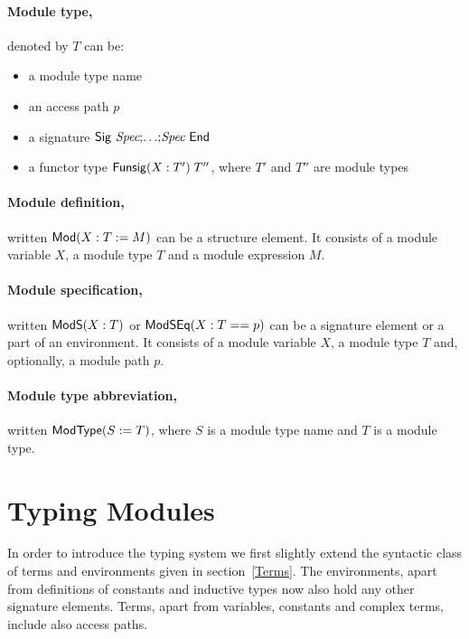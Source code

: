 \paragraph{Module type,} denoted by $T$ can be:
\begin{itemize}
\item a module type name
\item an access path $p$
\item a signature ${\sf Sig}~{\textit{Spec}} {\tt ;} {\ldots} {\tt ;} {\textit{Spec}}~{\sf End}$
\item a functor type ${\sf Funsig}(X:T')\;T''$, where $T'$ and $T''$ are
  module types
\end{itemize}

\paragraph{Module definition,} written ${\sf Mod}({X}:{T}:={M})$ can be a
structure element. It consists of a module variable $X$, a module type
$T$ and a module expression $M$.

\paragraph{Module specification,} written ${\sf ModS}({X}:{T})$ or
${\sf ModSEq}({X}:{T}=={p})$ can be a signature element or a part of an
environment. It consists of a module variable $X$, a module type $T$
and, optionally, a module path $p$. 

\paragraph{Module type abbreviation,} written ${\sf ModType}({S}:={T})$, where
$S$ is a module type name and $T$ is a module type.


\section{Typing Modules}

In order to introduce the typing system we first slightly extend
the syntactic class of terms and environments given in
section~\ref{Terms}. The environments, apart from definitions of
constants and inductive types now also hold any other signature elements.
Terms, apart from variables, constants and complex terms, 
include also access paths.

